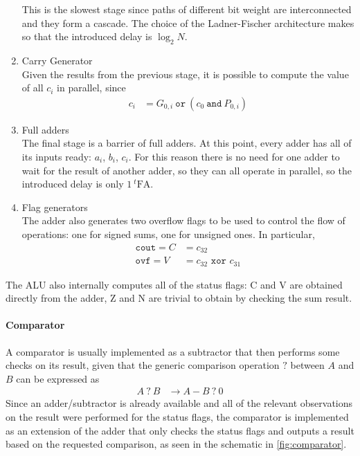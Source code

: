 \begin{enumerate}
    This is the slowest stage since paths of different bit weight are interconnected and they form a cascade.
    The choice of the Ladner-Fischer architecture makes so that the introduced delay is $\log_2{N}$.

    \item Carry Generator \\
    Given the results from the previous stage, it is possible to compute the value of all $c_i$ in parallel, since
    \begin{align*}
        c_i &= G_{0, i}\ \texttt{or}\ (c_0\ \texttt{and}\ P_{0, i})
    \end{align*}

    \item Full adders \\
    The final stage is a barrier of full adders. At this point, every adder has all of its inputs ready: $a_i$, $b_i$,
    $c_i$. For this reason there is no need for one adder to wait for the result of another adder, so they can all
    operate in parallel, so the introduced delay is only $1\ ^t\text{FA}$.

    \item Flag generators \\
    The adder also generates two overflow flags to be used to control the flow of operations: one for signed sums, one
    for unsigned ones. In particular,
    \begin{align*}
        \texttt{cout} = C &= c_{32} \\
        \texttt{ovf} = V &= c_{32} \texttt{ xor } c_{31}
    \end{align*}
\end{enumerate}
The ALU also internally computes all of the status flags: C and V are obtained directly from the adder, Z and N are
trivial to obtain by checking the sum result.

\paragraph{Comparator}
A comparator is usually implemented as a subtractor that then performs some checks on its result, given that the generic
comparison operation $?$ between $A$ and $B$ can be expressed as
\begin{align}
    A\ ?\ B &\rightarrow A - B\ ?\ 0
\end{align}
Since an adder/subtractor is already available and all of the relevant observations on the result were performed for
the status flags, the comparator is implemented as an extension of the adder that only checks the status flags and
outputs a result based on the requested comparison, as seen in the schematic in \autoref{fig:comparator}.

